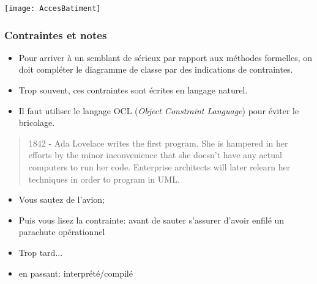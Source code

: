 \documentclass[french]{beamer}
\begin{document}
\begin{frame}
  \begin{center}
\end{center}
\end{frame}

\begin{frame}
  
\begin{center}
  \texttt{[image: AccesBatiment]}
\end{center}

\end{frame}

\begin{frame}\frametitle{Contraintes et notes}
  \begin{itemize}
  \item Pour arriver à  un semblant de sérieux par rapport  aux méthodes formelles, on
  doit compléter le diagramme de classe par des indications de contraintes.

\item Trop souvent, ces contraintes sont écrites en langage naturel.

  \item Il faut utiliser le langage OCL (\textit{Object Constraint Language}) pour éviter le bricolage.
  \end{itemize}
  
\end{frame}


\begin{frame}
  \begin{quote}
    1842 - Ada Lovelace writes the first program. She is hampered in her efforts
    by the minor inconvenience that she doesn't have any actual computers to run
    her code. Enterprise  architects will later relearn her  techniques in order
    to program in UML. 
  \end{quote}
\end{frame}


\begin{frame}
  \begin{itemize}
  \item Vous sautez de l'avion;
    \item Puis vous  lisez la contrainte: \og avant de  sauter s'assurer d'avoir
      enfilé un parachute opérationnel\fg{}
    \item Trop tard...
      \item en passant: interprété/compilé
  \end{itemize}
\end{frame}
\end{document}
